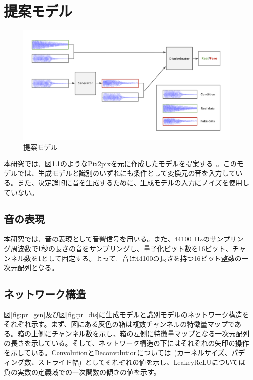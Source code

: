 \chapter{提案モデル}

\begin{figure}[b]
\begin{center}
\includegraphics[width=\hsize]{figure/pr_model.png}
\caption{提案モデル}
\label{fig:pr_model}
\end{center}
\end{figure}

本研究では、図\ref{fig:pr_model}のようなPix2pixを元に作成したモデルを提案する~\cite{pix2pix}。このモデルでは、生成モデルと識別のいずれにも条件として変換元の音を入力している。また、決定論的に音を生成するために、生成モデルの入力にノイズを使用していない。

\section{音の表現}

本研究では、音の表現として音響信号を用いる。また、44100~Hzのサンプリング周波数で1秒の長さの音をサンプリングし、量子化ビット数を16ビット、チャンネル数を1として固定する。よって、音は44100の長さを持つ16ビット整数の一次元配列となる。

\section{ネットワーク構造}

図\ref{fig:pr_gen}及び図\ref{fig:pr_dis}に生成モデルと識別モデルのネットワーク構造をそれぞれ示す。まず、図にある灰色の箱は複数チャンネルの特徴量マップである。箱の上側にチャンネル数を示し、箱の左側に特徴量マップとなる一次元配列の長さを示している。そして、ネットワーク構造の下にはそれぞれの矢印の操作を示している。ConvolutionとDeconvolutionについては~(カーネルサイズ、パディング数、ストライド幅)~としてそれぞれの値を示し、LeakeyReLUについては負の実数の定義域での一次関数の傾きの値を示す。

